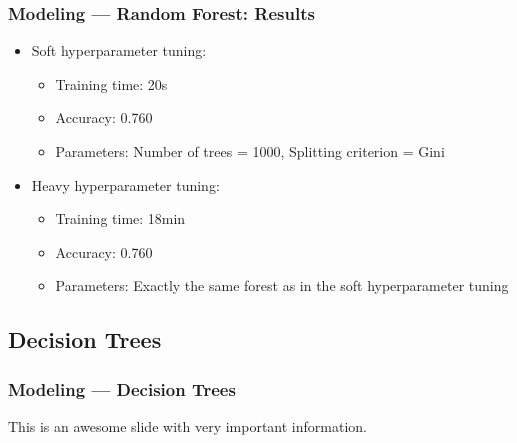 \documentclass[10pt, aspectratio=169]{beamer}
\begin{document}
\begin{frame}
    \frametitle{Modeling --- Random Forest: Results}
    \begin{itemize}
        \item Soft hyperparameter tuning:
        \begin{itemize}
            \item Training time: 20s
            \item Accuracy: 0.760
            \item Parameters: Number of trees = 1000, Splitting criterion = Gini
        \end{itemize}
        \item Heavy hyperparameter tuning:
        \begin{itemize}
            \item Training time: 18min
            \item Accuracy: 0.760
            \item Parameters: Exactly the same forest as in the soft hyperparameter tuning
        \end{itemize}
    \end{itemize}
\end{frame}

\subsection{Decision Trees}
\begin{frame}
    \frametitle{Modeling --- Decision Trees}
    \begin{outline}
        \1 This is an awesome slide with very important information. 
    \end{outline}
\end{frame}
\end{document}
